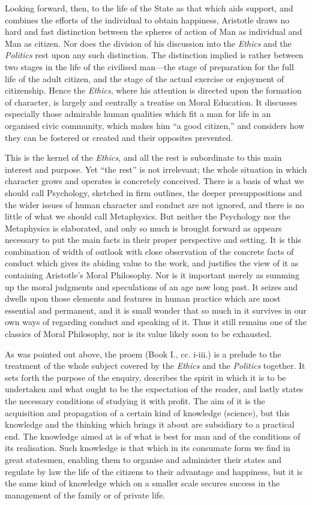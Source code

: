 Looking forward, then, to the life of the State as that which aids support, and
combines the efforts of the individual to obtain happiness, Aristotle draws no
hard and fast distinction between the spheres of action of Man as individual
and Man as citizen. Nor does the division of his discussion into the
\emph{Ethics} and the \emph{Politics} rest upon any such distinction. The
distinction implied is rather between two stages in the life of the civilised
man—the stage of preparation for the full life of the adult citizen, and
the stage of the actual exercise or enjoyment of citizenship. Hence the
\emph{Ethics}, where his attention is directed upon the formation of character,
is largely and centrally a treatise on Moral Education. It discusses especially
those admirable human qualities which fit a man for life in an organised civic
community, which makes him “a good citizen,” and considers how they
can be fostered or created and their opposites prevented.

This is the kernel of the \emph{Ethics}, and all the rest is subordinate to
this main interest and purpose. Yet “the rest” is not irrelevant;
the whole situation in which character grows and operates is concretely
conceived. There is a basis of what we should call Psychology, sketched in firm
outlines, the deeper presuppositions and the wider issues of human character
and conduct are not ignored, and there is no little of what we should call
Metaphysics. But neither the Psychology nor the Metaphysics is elaborated, and
only so much is brought forward as appears necessary to put the main facts in
their proper perspective and setting. It is this combination of width of
outlook with close observation of the concrete facts of conduct which gives its
abiding value to the work, and justifies the view of it as containing
Aristotle’s Moral Philosophy. Nor is it important merely as summing up
the moral judgments and speculations of an age now long past. It seizes and
dwells upon those elements and features in human practice which are most
essential and permanent, and it is small wonder that so much in it survives in
our own ways of regarding conduct and speaking of it. Thus it still remains one
of the classics of Moral Philosophy, nor is its value likely soon to be
exhausted.

As was pointed out above, the proem (Book I., cc. i-iii.) is a prelude to the
treatment of the whole subject covered by the \emph{Ethics} and the
\emph{Politics} together. It sets forth the purpose of the enquiry, describes
the spirit in which it is to be undertaken and what ought to be the expectation
of the reader, and lastly states the necessary conditions of studying it with
profit. The aim of it is the acquisition and propagation of a certain kind of
knowledge (science), but this knowledge and the thinking which brings it about
are subsidiary to a practical end. The knowledge aimed at is of what is best
for man and of the conditions of its realisation. Such knowledge is that which
in its consumate form we find in great statesmen, enabling them to organise and
administer their states and regulate by law the life of the citizens to their
advantage and happiness, but it is the same kind of knowledge which on a
smaller scale secures success in the management of the family or of private
life.

